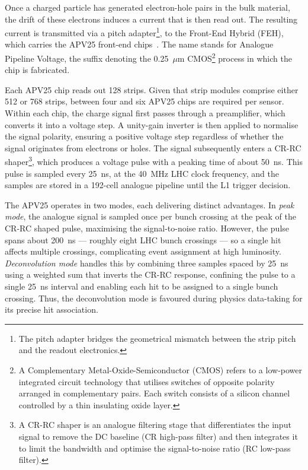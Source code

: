 Once a charged particle has generated electron-hole pairs in the bulk material, the drift of these electrons induces a current that is then read out. The resulting current is transmitted via a pitch adapter\footnote{The pitch adapter bridges the geometrical mismatch between the strip pitch and the readout electronics.}, to the Front-End Hybrid (FEH), which carries the APV25 front-end chips~\cite{ReadoutStrip}. The name stands for Analogue Pipeline Voltage,
the suffix denoting the 0.25~$\mu$m CMOS\footnote{A Complementary Metal-Oxide-Semiconductor (CMOS) refers to a low-power integrated circuit technology that utilises switches of opposite polarity arranged in complementary pairs. Each switch consists of a silicon channel controlled by a thin insulating oxide layer.} process in which the chip is fabricated.

\vspace{0.5 cm}

Each APV25 chip reads out 128 strips. Given that strip modules comprise either 512 or 768 strips, between four and six APV25 chips are required per sensor. Within each chip, the charge signal first passes through a preamplifier, which converts it into a voltage step. A unity-gain inverter is then applied to normalise the signal polarity, ensuring a positive voltage step regardless of whether the signal originates from electrons or holes. The signal subsequently enters a CR-RC shaper\footnote{A CR-RC shaper is an analogue filtering stage that differentiates the input signal to remove the DC baseline (CR high-pass filter) and then integrates it to limit the bandwidth and optimise the signal-to-noise ratio (RC low-pass filter).}, which produces a voltage pulse with a peaking time of about 50~ns. This pulse is sampled every 25~ns, at the 40~MHz LHC clock frequency, and the samples are stored in a 192-cell analogue pipeline until the L1 trigger decision.

The APV25 operates in two modes, each delivering distinct advantages. In \textit{peak mode}, the analogue signal is sampled once per bunch crossing at the peak of the CR-RC shaped pulse, maximising the signal-to-noise ratio. However, the pulse spans about 200~ns --- roughly eight LHC bunch crossings --- so a single hit affects multiple crossings, complicating event assignment at high luminosity. \textit{Deconvolution mode} handles this by combining three samples spaced by 25~ns using a weighted sum that inverts the CR-RC response, confining the pulse to a single 25~ns interval and enabling each hit to be assigned to a single bunch crossing. Thus, the deconvolution mode is favoured during physics data-taking for its precise hit association.


